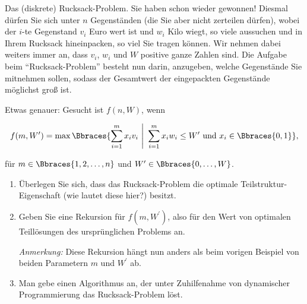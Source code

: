
\begin{exercise}

Das (diskrete) Rucksack-Problem.
Sie haben schon wieder gewonnen!
Diesmal dürfen Sie sich unter $n$ Gegenständen (die Sie aber nicht zerteilen dürfen), wobei der $i$-te Gegenstand $v_i$ Euro wert ist und $w_i$ Kilo wiegt, so viele aussuchen und in Ihrem Rucksack hineinpacken, so viel Sie tragen können.
Wir nehmen dabei weiters immer an, dass $v_i$, $w_i$ und $W$ positive ganze Zahlen sind.
Die Aufgabe beim \enquote{Rucksack-Problem} besteht nun darin, anzugeben, welche Gegenstände Sie mitnehmen sollen, sodass der Gesamtwert der eingepackten Gegenstände möglichst groß ist.

Etwas genauer:
Gesucht ist $f(n, W)$, wenn

\begin{align*}
  f(m, W^\prime)
  =
  \max
  \Bbraces
  {
    \sum_{i=1}^m
      x_i v_i
    ~\Bigg |~
    \sum_{i=1}^m
      x_i w_i
    \leq
    W^\prime
    ~\text{und}~
    x_i \in \Bbraces{0, 1}
  },
\end{align*}

für $m \in \Bbraces{1, 2, \dots, n}$ und $W^\prime \in \Bbraces{0, \dots, W}$.

\begin{enumerate}[label = \alph*]

  \item Überlegen Sie sich, dass das Rucksack-Problem die optimale Teilstruktur-Eigenschaft (wie lautet diese hier?) besitzt.

  \item Geben Sie eine Rekursion für $f(m, W^\prime)$, also für den Wert von optimalen Teillösungen des ursprünglichen Problems an.

  \textit{Anmerkung:}
  Diese Rekursion hängt nun anders als beim vorigen Beispiel von beiden Parametern $m$ und $W^\prime$ ab.

  \item Man gebe einen Algorithmus an, der unter Zuhilfenahme von dynamischer Programmierung das Rucksack-Problem löst.

\end{enumerate}

\end{exercise}



